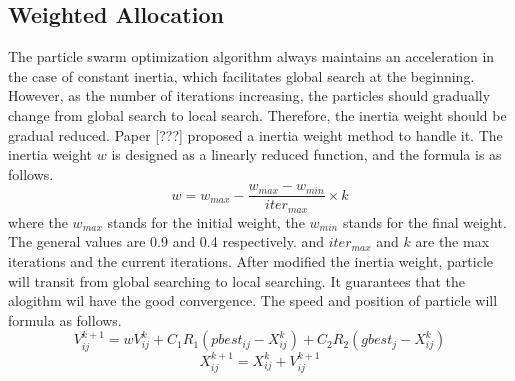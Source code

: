 \subsection{Weighted Allocation}\label{subsec:weight}
\par The particle swarm optimization algorithm always maintains an acceleration in the case of constant inertia, which facilitates global search at the beginning. However, as the number of iterations increasing, the particles should gradually change from global search to local search. Therefore, the inertia weight should be gradual reduced. Paper [???] proposed a inertia weight method to handle it. The inertia weight $w$ is designed as a linearly reduced function, and the formula is as follows.
\begin{equation}
w=w_{max}-\frac{w_{max}-w_{min}}{iter_{max}} \times k
\end{equation}
where the $ w_{max} $ stands for the initial weight, the $ w_{min} $ stands for the final weight. The general values are 0.9 and 0.4 respectively. and $ iter_{max} $ and $ k $ are the max iterations and the current iterations. After modified the inertia weight, particle will transit from global searching to local searching. It guarantees that the alogithm wil have the good convergence. The speed and position of particle will formula as follows.
\begin{equation}
V^{k+1}_{ij} = wV^{k}_{ij} + C_1 R_1(pbest_{ij}-X^k_{ij}) + C_2 R_2 (gbest_j-X^k_{ij})
\end{equation}
\begin{equation}
X^{k+1}_{ij} = X^{k}_{ij} + V^{k+1}_{ij}
\end{equation}
